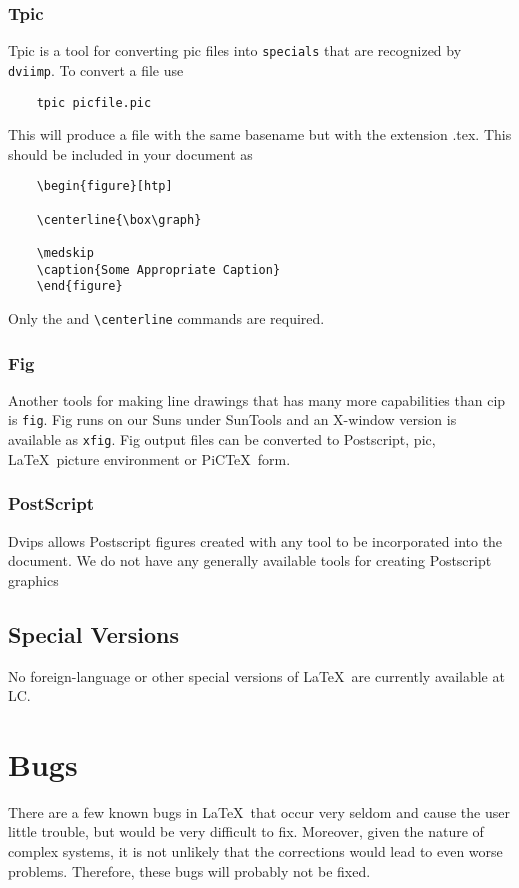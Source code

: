 \subsubsection{Tpic}
Tpic is a tool for converting pic files into \verb|specials| that are
recognized by {\tt dviimp}.  To convert a file use
\begin{verbatim}
	tpic picfile.pic
\end{verbatim}
This will produce a file with the same basename but with the extension
.tex.  This should be included in your document as
\begin{verbatim}
	\begin{figure}[htp]
	
	\centerline{\box\graph}

	\medskip
	\caption{Some Appropriate Caption}
	\end{figure}
\end{verbatim}

Only the \verb|| and \verb|\centerline| commands are required.
\subsubsection{Fig}
Another tools for making line drawings that has many more capabilities
than cip is {\tt fig}.  Fig runs on our Suns under SunTools and an X-window
version is available as {\tt xfig}.  Fig output files can be converted
to Postscript, pic, \LaTeX\ picture environment or PiC\TeX\ form.
\subsubsection{PostScript}
Dvips allows Postscript figures created with any tool to be
incorporated into the document.  We do not have any generally
available tools for creating Postscript graphics
\subsection{Special Versions}

No foreign-language or other special versions of \LaTeX\
are currently available at LC.


\section{Bugs}

There are a few known bugs in \LaTeX\ that occur very seldom and
cause the user little trouble, but would be very difficult to fix.
Moreover, given the nature of complex systems, it is not unlikely that
the corrections would lead to even worse problems.  Therefore, these
bugs will probably not be fixed.  

